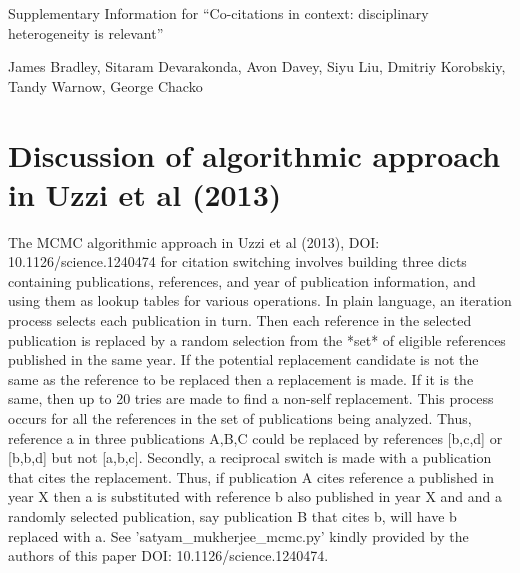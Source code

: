 \documentclass{article}
\begin{document}
\centerline{Supplementary Information for ``Co-citations in context: disciplinary heterogeneity is relevant''}
\centerline{James Bradley, Sitaram Devarakonda, Avon Davey, Siyu Liu, Dmitriy Korobskiy, Tandy Warnow, George Chacko}


\section{Discussion of algorithmic approach in Uzzi et al (2013)}
The MCMC algorithmic approach in Uzzi et al (2013), DOI: 10.1126/science.1240474 for citation switching involves building three dicts 
containing publications, references, and year of publication information, and using them as lookup tables for  various operations. In plain language, an iteration process selects each publication in turn. Then each reference in 
the selected publication is replaced by a random selection from the *set* of eligible references published in the same year.  If the potential replacement candidate is not the same as the reference to be replaced then a replacement is made. If it is the same, then up to 20 tries are made to find a non-self replacement. This process occurs for all the references in the set of publications being analyzed. Thus, reference a in three publications A,B,C could be replaced by references [b,c,d] or [b,b,d] but not [a,b,c]. Secondly, a reciprocal switch is made with a publication that cites the replacement. Thus, if publication A cites reference a published in year X then a is substituted with reference b also published in year X and and a randomly selected publication, say publication B that cites b, will have b replaced with a. See 'satyam\_mukherjee\_mcmc.py' kindly provided by the authors of this paper DOI: 10.1126/science.1240474.
\end{document}
